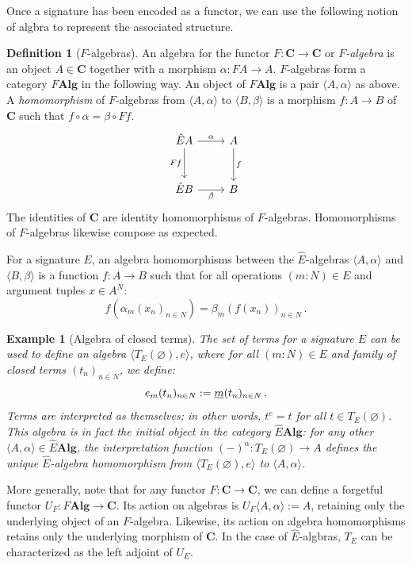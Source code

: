 \documentclass[11pt,oneside,draft]{book}
\newtheorem{example}[theorem]{Example}
\theoremstyle{definition}
\newtheorem{definition}[theorem]{Definition}
\newcommand{\ul}[1]{%
  \underline{\smash{#1}}
}
\begin{document}
Once a signature has been encoded as a functor,
we can use the following notion of algbra
to represent the associated structure.

\begin{definition}[$F$-algebras]
An algebra for the functor
$F : \mathbf{C} \rightarrow \mathbf{C}$
or \emph{$F$-algebra}
is an object $A \in \mathbf{C}$
together with a morphism $\alpha : F A \rightarrow A$.
$F$-algebras form a category $F \mathbf{Alg}$
in the following way.
An object of $F \mathbf{Alg}$
is a pair $\langle A, \alpha \rangle$ as above.
A \emph{homomorphism} of $F$-algebras
from $\langle A, \alpha \rangle$ to $\langle B, \beta \rangle$
is a morphism $f : A \rightarrow B$ of $\mathbf{C}$
such that $f \circ \alpha = \beta \circ F f$.
\[
  \begin{tikzcd}[row sep=large]
    \hat{E} A \ar[r, "\alpha"] \ar[d, "F f"'] & A \ar[d, "f"] \\
    \hat{E} B \ar[r, "\beta"']                & B
  \end{tikzcd}
\]
The identities of $\mathbf{C}$
are identity homomorphisms of $F$-algebras.
Homomorphisms of $F$-algebras likewise compose as expected.
\end{definition}

For a signature $E$,
an algebra homomorphisms
between the $\hat{E}$-algebras
$\langle A, \alpha \rangle$ and
$\langle B, \beta \rangle$
is a function $f : A \rightarrow B$ such that
for all operations $(m \mathbin{:} N) \in E$
and argument tuples $x \in A^N$:
\[
  f(\alpha_m(x_n)_{n \in N}) = \beta_m(f(x_n))_{n \in N} \,.
\]

\begin{example}[Algebra of closed terms]
The set of terms for a signature $E$
can be used to define an algebra
$\langle T_E(\varnothing), e \rangle$,
where for all $(m \mathbin{:} N) \in E$ and
family of closed terms $(t_n)_{n \in N}$,
we define:
\[
  e_m(t_n)_{n \in N} := \ul{m}(t_n)_{n \in N}
  \,.
\]
Terms are interpreted as themselves;
in other words, $t^e = t$ for all $t \in T_E(\varnothing)$.
This algebra is in fact the \emph{initial object}
in the category $\hat{E} \mathbf{Alg}$:
for any other
$\langle A, \alpha \rangle \in \hat{E} \mathbf{Alg}$,
the interpretation function
$(-)^\alpha : T_E(\varnothing) \rightarrow A$
defines the unique $\hat{E}$-algebra homomorphism
from $\langle T_E(\varnothing), e \rangle$ to
$\langle A, \alpha \rangle$.
\end{example}

More generally,
note that for any functor $F : \mathbf{C} \rightarrow \mathbf{C}$,
we can define a forgetful functor
$U_F : F \mathbf{Alg} \rightarrow \mathbf{C}$.
Its action on algebras is
$U_F \langle A, \alpha \rangle := A$,
retaining only the underlying object of an $F$-algebra.
Likewise,
its action on algebra homomorphisms
retains only the underlying morphism of $\mathbf{C}$.
In the case of $\hat{E}$-algbras,
$T_E$ can be characterized as the left adjoint of $U_E$.
\end{document}
